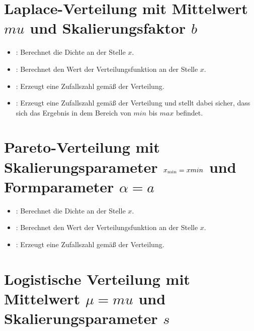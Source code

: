 \section{Laplace-Verteilung mit Mittelwert \texorpdfstring{$mu$}{mu} und Skalierungsfaktor \texorpdfstring{$b$}{b}}

\begin{itemize}

\item
{}:
Berechnet die Dichte an der Stelle $x$.

\item
{}:
Berechnet den Wert der Verteilungsfunktion an der Stelle $x$.

\item
{}:
Erzeugt eine Zufallszahl gemäß der Verteilung.

\item
{}:
Erzeugt eine Zufallszahl gemäß der Verteilung und stellt dabei sicher, dass sich das Ergebnis in dem Bereich von $min$ bis $max$ befindet.

\end{itemize}



\section{Pareto-Verteilung mit Skalierungsparameter \texorpdfstring{$x_{\rm min}=xmin$}{xmin} und Formparameter \texorpdfstring{$\alpha=a$}{a}}

\begin{itemize}

\item
{}:
Berechnet die Dichte an der Stelle $x$.

\item
{}:
Berechnet den Wert der Verteilungsfunktion an der Stelle $x$.

\item
{}:
Erzeugt eine Zufallszahl gemäß der Verteilung.

\end{itemize}



\section{Logistische Verteilung mit Mittelwert \texorpdfstring{$\mu=mu$}{mu} und Skalierungsparameter \texorpdfstring{$s$}{s}}

